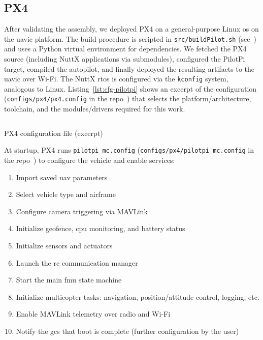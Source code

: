 \subsection{PX4}
\label{sec:px4}
After validating the assembly, we deployed PX4 on a general-purpose Linux
\gls{os} on the \gls{uavic} platform. The build procedure is scripted in
\lstinline{src/buildPilot.sh} (see~\cite{thesis-sw-github}) and uses a Python
virtual environment for dependencies. We fetched the PX4 source (including
NuttX applications via submodules), configured the PilotPi target, compiled the
autopilot, and finally deployed the resulting artifacts to the \gls{uavic} over
Wi-Fi.
%
The NuttX \gls{rtos} is configured via the \lstinline{kconfig} system,
analogous to Linux. Listing~\ref{lst:cfg-pilotpi} shows an excerpt of the
configuration (\lstinline{configs/px4/px4.config} in the repo~\cite{thesis-sw-github})
that selects the platform/architecture, toolchain, and the modules/drivers
required for this work.

\begin{longlisting}
\centering
\inputminted[]{kconfig}{./listing/px4.config}
\caption{PX4 configuration file (excerpt)}
\label{lst:cfg-pilotpi}
\end{longlisting}

At startup, PX4 runs \lstinline{pilotpi_mc.config}
(\lstinline{configs/px4/pilotpi_mc.config} in the repo~\cite{thesis-sw-github})
to configure the vehicle and enable services:
\begin{enumerate}[noitemsep,topsep=0pt]
\item Import saved \gls{uav} parameters
\item Select vehicle type and airframe
\item Configure camera triggering via MAVLink
\item Initialize geofence, \gls{cpu} monitoring, and battery status
\item Initialize sensors and actuators
\item Launch the \gls{rc} communication manager
\item Start the main \gls{fmu} state machine
\item Initialize multicopter tasks: navigation, position/attitude control, logging, etc.
\item Enable MAVLink telemetry over radio and Wi-Fi
\item Notify the \gls{gcs} that boot is complete (further configuration by the user)
\end{enumerate}


